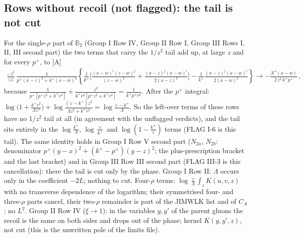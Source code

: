\documentclass[9pt]{article}
\def\mf#1{\mathbb{#1}}
\numberwithin{equation}{section}
\begin{document}
\subsection{Rows without recoil (not flagged): the tail is not cut}
\noindent For the single-$\rho$ part of $\mf{B}_{2}$ (Group I Row IV, Group II Row I, Group III Rows I, II, III second part) the two terms that carry the $1/z^{2}$ tail add up, at large $z$ and for every $p^{+}$, to [A]
\begin{align}\label{eq:B2id}
\frac{-\hat z^{j}}{|z|}\,\frac{1}{p^{+}(x-z)^{2}+k^{+}(x-w)^{2}}\left\{\frac{1}{p^{+}}\Big[\frac{(x-w)^{i}(z-w)^{j}}{(z-w)^{2}}+\frac{(x-z)^{j}(x-w)^{i}}{2(x-z)^{2}}\Big]-\frac{1}{k^{+}}\frac{(x-z)^{j}(x-w)^{i}}{2(x-w)^{2}}\right\}\to-\frac{\mathcal{K}^{i}(x-w)}{2\,z^{2}\,k^{+}p^{+}}\,,
\end{align}
because $\frac{1}{p^{+}[p^{+}z^{2}+k^{+}r^{2}]}+\frac{z^{2}}{k^{+}r^{2}[p^{+}z^{2}+k^{+}r^{2}]}=\frac{1}{k^{+}p^{+}r^{2}}$. After the $p^{+}$ integral: $\log\big(1+\frac{k^{+}r^{2}}{\Lambda z^{2}}\big)+\log\frac{(\vee-k^{+})z^{2}}{\Lambda z^{2}+k^{+}r^{2}}=\log\frac{\vee-k^{+}}{\Lambda}$. So the left-over terms of these rows have no $1/z^{2}$ tail at all (in agreement with the unflagged verdicts), and the tail sits entirely in the $\log\frac{k^{+}}{\Lambda}$, $\log\frac{\vee}{k^{+}}$ and $\log(1-\frac{k^{+}}{\vee})$ terms (FLAG I-6 is this tail). The same identity holds in Group I Row V second part ($N_{2a}$, $N_{2b}$: denominator $p^{+}(y-x)^{2}+(k^{+}-p^{+})(y-z)^{2}$; the plus-prescription bracket and the last bracket) and in Group III Row III second part (FLAG III-3 is this cancellation): there the tail is cut only by the phase. Group I Row II: $\Lambda$ occurs only in the coefficient $-2L$; nothing to cut. Four-$\rho$ terms: $\log\frac{\vee}{\Lambda}\int_{z}K(u,v,z)$ with no transverse dependence of the logarithm; their symmetrised four- and three-$\rho$ parts cancel, their two-$\rho$ remainder is part of the JIMWLK list and of $C_{A}$; no $L^{2}$. Group II Row IV ($\xi\to1$): in the variables $y,y'$ of the parent gluons the recoil is the same on both sides and drops out of the phase; kernel $K(y,y',z)$, not cut (this is the unwritten pole of the limits file).
\end{document}

